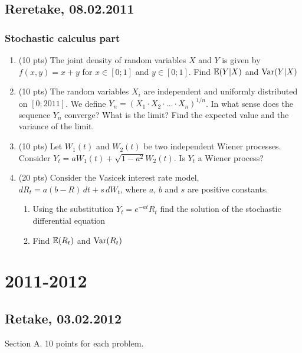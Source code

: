 \documentclass[12pt, a4paper]{article}
\begin{document}
\subsection{Reretake, 08.02.2011}

\subsubsection*{Stochastic calculus part}

\begin{enumerate}

\item (10 pts) The joint density of random variables $X$ and $Y$ is given by $f(x,y)=x+y$ for $x\in [0;1]$ and $y\in[0;1]$. Find $\mathbb{E}(Y|X)$ and $\operatorname{Var}(Y|X)$
\item (10 pts) The random variables $X_i$ are independent and uniformly distributed on $[0;2011]$. We define $Y_n=(X_1\cdot X_2\cdot \ldots \cdot X_n)^{1/n}$. In what sense does the sequence $Y_n$ converge? What is the limit? Find the expected value and the variance of the limit.
\item (10 pts) Let $W_1(t)$ and $W_2(t)$ be two independent Wiener processes. Consider $Y_t=aW_1(t)+\sqrt{1-a^2}W_2 (t)$. Is $Y_t$ a Wiener process?
\item (20 pts) Consider the Vasicek interest rate model, $dR_t=a(b-R) \, dt+s \, dW_t$, where $a$, $b$ and $s$ are positive constants.
\begin{enumerate}
\item Using the substitution $Y_t=e^{-at} R_t$ find the solution of the stochastic differential equation
\item Find $\mathbb{E}(R_t)$ and $\operatorname{Var}(R_t)$
\end{enumerate}


\end{enumerate}

\section{2011-2012}

\subsection{Retake, 03.02.2012}

Section A.  10 points for each problem.
\end{document}
